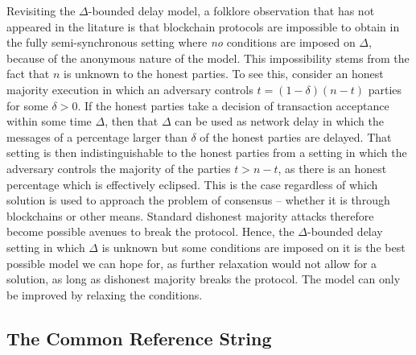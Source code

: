 \begin{remark}
Revisiting the $\Delta$-bounded delay model, a folklore observation that has not appeared in
the litature is that blockchain protocols are impossible to obtain in the fully
semi-synchronous setting where \emph{no} conditions are imposed on $\Delta$,
because of the anonymous nature of the model. This impossibility stems from the
fact that $n$ is unknown to the honest parties. To see this, consider an
honest majority execution in which an adversary controls $t = (1 - \delta)(n -
t)$ parties for some $\delta > 0$. If the honest parties take a decision of
transaction acceptance within some time $\Delta$, then that $\Delta$ can be used
as network delay in which the messages of a percentage larger than $\delta$ of
the honest parties are delayed. That setting is then indistinguishable to the
honest parties from a setting in which the adversary controls the majority of
the parties $t > n - t$, as there is an honest percentage which is effectively
eclipsed. This is the case regardless of which solution is used to approach the
problem of consensus -- whether it is through blockchains or other means.
Standard dishonest majority attacks therefore become possible avenues to break
the protocol. Hence, the $\Delta$-bounded delay setting in which $\Delta$ is
unknown but some conditions are imposed on it is the best possible model we can
hope for, as further relaxation would not allow for a solution, as long as
dishonest majority breaks the protocol. The model can only be improved by
relaxing the conditions.
\end{remark}


\subsection{The Common Reference String}



